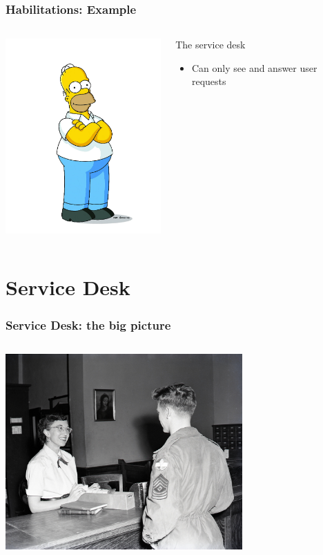 \documentclass{beamer}
\begin{document}
\begin{frame}
\frametitle{Habilitations: Example}
\begin{columns}
 \begin{column}{0.45\textwidth}
         \includegraphics[height=7.5cm]{./pics/simpsons/homer.jpg}
 \end{column}
 \begin{column}{0.45\textwidth}
    \begin{block}{The service desk}
        \begin{itemize}
            \item Can only see and answer user requests
        \end{itemize}
    \end{block}
 \end{column}
\end{columns}
\end{frame}




\section{Service Desk}

\begin{frame}
\frametitle{Service Desk: the big picture}
\begin{columns}
\begin{column}{0.45\textwidth}
\includegraphics[height=7.5cm]{./pics/servicedesk.jpg}
\end{column}
\begin{column}{0.45\textwidth}
\end{column}
\end{columns}
\end{frame}
\end{document}
